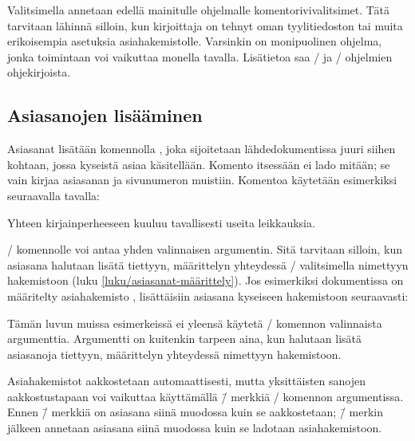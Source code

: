 Valitsimella  annetaan edellä mainitulle ohjelmalle
komentorivivalitsimet. Tätä tarvitaan lähinnä silloin, kun kirjoittaja
on tehnyt oman tyylitiedoston tai muita erikoisempia asetuksia
asiahakemistolle. Varsinkin  on monipuolinen ohjelma, jonka
toimintaan voi vaikuttaa monella tavalla. Lisätietoa saa
\-/{} ja \-/ ohjelmien ohjekirjoista.

\subsection{Asiasanojen lisääminen}
\label{luku/asiasanat-lisääminen}

Asiasanat lisätään komennolla , joka sijoitetaan
lähdedokumentissa juuri siihen kohtaan, jossa kyseistä asiaa
käsitellään. Komento itsessään ei lado mitään; se vain kirjaa asiasanan
ja sivunumeron muistiin. Komentoa käytetään esimerkiksi seuraavalla
tavalla:

\begin{koodilohkosis}
Yhteen  kirjainperheeseen kuuluu tavallisesti
useita  leikkauksia.
\end{koodilohkosis}

\noindent
{}\-/ komennolle voi antaa yhden valinnaisen argumentin.
Sitä tarvitaan silloin, kun asiasana halutaan lisätä tiettyyn,
määrittelyn yhteydessä \-/ valitsimella nimettyyn
hakemistoon (luku \ref{luku/asiasanat-määrittely}). Jos esimerkiksi
dokumentissa on määritelty asiahakemisto
, lisättäisiin
asiasana kyseiseen hakemistoon seuraavasti:

\begin{koodilohkosis}
\end{koodilohkosis}

\noindent
Tämän luvun muissa esimerkeissä ei yleensä käytetä \-/
komennon valinnaista argumenttia. Argumentti on kuitenkin tarpeen aina,
kun halutaan lisätä asiasanoja tiettyyn, määrittelyn yhteydessä
nimettyyn hakemistoon.

Asiahakemistot aakkostetaan automaattisesti, mutta yksittäisten sanojen
aakkostustapaan voi vaikuttaa käyttämällä \=/ merkkiä
\-/ komennon argumentissa. Ennen \=/ merkkiä on
asiasana siinä muodossa kuin se aakkostetaan; \=/ merkin
jälkeen annetaan asiasana siinä muodossa kuin se ladotaan
asiahakemistoon.

